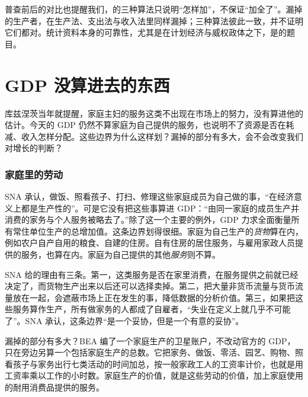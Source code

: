 
普查前后的对比也提醒我们，的三种算法只说明“怎样加”，不保证“加全了”。漏掉的生产者，在生产法、支出法与收入法里同样漏掉；三种算法彼此一致，并不证明它们都对。统计资料本身的可靠性，尤其是在计划经济与威权政体之下，是的题目。

\section{GDP 没算进去的东西}\label{sec:accounts-limits}

库兹涅茨当年就提醒，家庭主妇的服务这类不出现在市场上的努力，没有算进他的估计。今天的 GDP 仍然不算家庭为自己提供的服务，也说明不了资源是否在耗减、收入怎样分配。这些边界为什么这样划？漏掉的部分有多大，会不会改变我们对增长的判断？

\subsubsection{家庭里的劳动}
SNA 承认，做饭、照看孩子、打扫、修理这些家庭成员为自己做的事，“在经济意义上都是生产性的”。可是它没有把这些事算进 GDP：“由同一家庭的成员生产并消费的家务与个人服务被略去了。”除了这一个主要的例外，GDP 力求全面衡量所有常住单位生产的总增加值\cite{sna2008}。这条边界划得很细。家庭为自己生产的\emph{货物}算在内，例如农户自产自用的粮食、自建的住房。自有住房的居住服务，与雇用家政人员提供的服务，也算在内。家庭为自己提供的其他\emph{服务}则不算\cite{sna2008}。

SNA 给的理由有三条。第一，这类服务是否在家里消费，在服务提供之前就已经决定了，而货物生产出来以后还可以选择卖掉。第二，把大量非货币流量与货币流量放在一起，会遮蔽市场上正在发生的事，降低数据的分析价值。第三，如果把这些服务算作生产，所有做家务的人都成了自雇者，“失业在定义上就几乎不可能了”。SNA 承认，这条边界“是一个妥协，但是一个有意的妥协”\cite{sna2008}。

漏掉的部分有多大？BEA 编了一个家庭生产的卫星账户，不改动官方的 GDP，只在旁边另算一个包括家庭生产的总数。它把家务、做饭、零活、园艺、购物、照看孩子与家务出行七类活动的时间加总，按一般家政工人的工资率计价，也就是用工资率乘以工作的小时数。家庭生产的价值，就是这些劳动的价值，加上家庭使用的耐用消费品提供的服务\cite{kk2019}。

